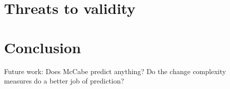 \documentclass[9pt,twocolumn,a4paper]{article}
\begin{document}
\section{Threats to validity}

\section{Conclusion}

Future work: Does McCabe predict anything? Do the change complexity measures do a better job of prediction?
\end{document}
